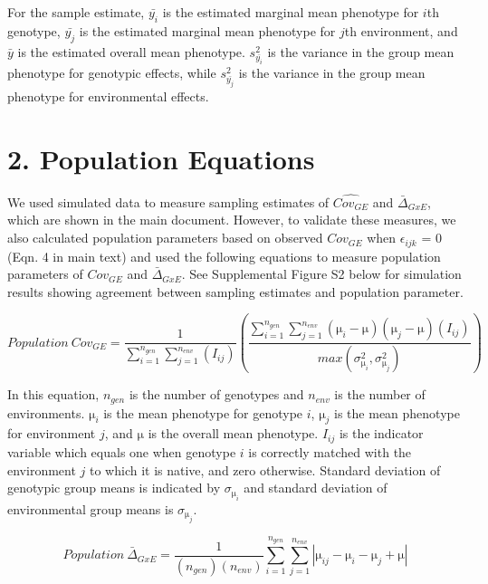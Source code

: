 \documentclass[11pt, oneside]{amsart}
\begin{document}
For the sample estimate, $\bar{y_{i}}$ is the estimated marginal mean phenotype for $i$th genotype, $\bar{y_{j}}$ is the estimated marginal mean phenotype for  $j$th  environment, and $\bar{y}$ is the estimated overall mean phenotype. $s^2_{\bar{y_{i}}}$  is the variance in the group mean phenotype for genotypic effects, while  $s^2_{\bar{y_{j}}}$ is the variance in the group mean phenotype for environmental effects.


\clearpage
\newpage

\section{2. Population Equations}

We used simulated data to measure sampling estimates of $\hat{Cov_{GE}}$ and $\bar\Delta_{GxE}$, which are shown in the main document. However, to validate these measures, we also calculated population parameters based on observed $Cov_{GE}$ when $\epsilon_{ijk}$ = 0 (Eqn. 4 in main text) and used the following equations to measure population parameters of $Cov_{GE}$ and $\bar\Delta_{GxE}$. See Supplemental Figure S2 below for simulation results showing agreement between sampling estimates and population parameter. 
 
\begin{equation}
Population\:  Cov_{GE} =   \frac{1}{ \sum_{i=1}^{n_{gen}}  \sum_{j=1}^{n_{env}}(I_{ij})}(\frac{\sum_{i=1}^{n_{gen}} \sum_{j=1}^{n_{env}}(\si\micro_{i} - \si\micro)(\si\micro_{j} - \si\micro)(I_{ij})}{max(\sigma^2_{\si\micro_{i}},\sigma^2_{\si\micro_{j}})})
\end{equation}

In this equation, $n_{gen}$ is the number of genotypes and $n_{env}$ is the number of environments. $\si\micro_{i}$ is the mean phenotype for genotype $i$, $\si\micro_{j}$ is the mean phenotype for environment $j$, and $ \si\micro$ is the overall mean phenotype. $I_{ij}$ is the indicator variable which equals one when genotype $i$ is correctly matched with the environment   $j$ to which it is native, and zero otherwise. Standard deviation of genotypic group means is indicated by $\sigma_{\si\micro_{i}}$ and standard deviation of environmental group means is $\sigma_{\si\micro_{j}}$. 

\begin{equation}
Population\:  \bar\Delta_{GxE} =   \frac{1}{ (n_{gen})(n_{env})}  \sum_{i=1}^{n_{gen}}\sum_{j=1}^{n_{env}}|\si\micro_{ij} - \si\micro_{i} - \si\micro_{j} + \si\micro|
\end{equation}
\end{document}
